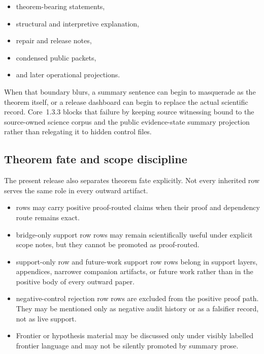 \begin{itemize}
\item theorem-bearing statements,
\item structural and interpretive explanation,
\item repair and release notes,
\item condensed public packets,
\item and later operational projections.
\end{itemize}

When that boundary blurs, a summary sentence can begin to masquerade as the
theorem itself, or a release dashboard can begin to replace the actual
scientific record. Core~1.3.3 blocks that failure by keeping source witnessing
bound to the source-owned science corpus and the public evidence-state summary projection
rather than relegating it to hidden control files.

\subsection{Theorem fate and scope discipline}

The present release also separates theorem fate explicitly. Not every inherited
row serves the same role in every outward artifact.

\begin{itemize}
\item {} rows may carry positive proof-routed claims
      when their proof and dependency route remains exact.
\item bridge-only support row rows may remain scientifically useful under
      explicit scope notes, but they cannot be promoted as proof-routed.
\item support-only row and future-work support row rows belong in support
      layers, appendices, narrower companion artifacts, or future work rather
      than in the positive body of every outward paper.
\item negative-control rejection row rows are excluded from the positive proof path. They may
      be mentioned only as negative audit history or as a falsifier record, not
      as live support.
\item Frontier or hypothesis material may be discussed only under visibly
      labelled frontier language and may not be silently promoted by summary
      prose.
\end{itemize}

